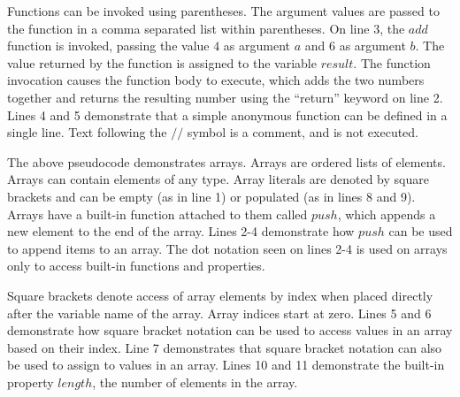 Functions can be invoked using parentheses. The argument values are passed to the function in a comma separated list within parentheses. On line 3, the $add$ function is invoked, passing the value $4$ as argument $a$ and $6$ as argument $b$. The value returned by the function is assigned to the variable $result$. The function invocation causes the function body to execute, which adds the two numbers together and returns the resulting number using the ``return'' keyword on line 2. Lines 4 and 5 demonstrate that a simple anonymous function can be defined in a single line. Text following the $//$ symbol is a comment, and is not executed.


The above pseudocode demonstrates arrays. Arrays are ordered lists of elements. Arrays can contain elements of any type. Array literals are denoted by square brackets and can be empty (as in line 1) or populated (as in lines 8 and 9). Arrays have a built-in function attached to them called $push$, which appends a new element to the end of the array. Lines 2-4 demonstrate how $push$ can be used to append items to an array. The dot notation seen on lines 2-4 is used on arrays only to access built-in functions and properties.

Square brackets denote access of array elements by index when placed directly after the variable name of the array. Array indices start at zero. Lines 5 and 6 demonstrate how square bracket notation can be used to access values in an array based on their index. Line 7 demonstrates that square bracket notation can also be used to assign to values in an array. Lines 10 and 11 demonstrate the built-in property $length$, the number of elements in the array.

